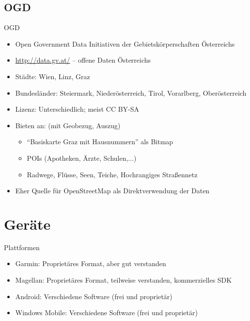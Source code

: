\documentclass{beamer}
\begin{document}
\subsection{OGD}
\begin{frame}{OGD}
  \begin{itemize}
    \item Open Government Data Initiativen der Gebietskörperschaften
      Österreichs
    \item \url{http://data.gv.at/} -- offene Daten Österreichs
    \item Städte: Wien, Linz, Graz
    \item Bundesländer: Steiermark, Niederösterreich, Tirol,
      Vorarlberg, Oberösterreich
    \item Lizenz: Unterschiedlich; meist CC BY-SA
    \item Bieten an: (mit Geobezug, Auszug)
    \begin{itemize}
      \item ``Basiskarte Graz mit Hausnummern'' als Bitmap
      \item POIs (Apotheken, Ärzte, Schulen,...)
      \item Radwege, Flüsse, Seen, Teiche, Hochrangiges Straßennetz
    \end{itemize}
    \item Eher Quelle für OpenStreetMap als Direktverwendung der Daten
  \end{itemize}
\end{frame}

\section{Geräte}
\begin{frame}{Plattformen}
  \begin{itemize}
    \item Garmin: Proprietäres Format, aber gut
      verstanden
    \item Magellan: Proprietäres Format, teilweise
      verstanden, kommerzielles SDK
    \item Android: Verschiedene Software (frei und proprietär)
    \item Windows Mobile: Verschiedene Software (frei und proprietär)
  \end{itemize}
\end{frame}
\end{document}
